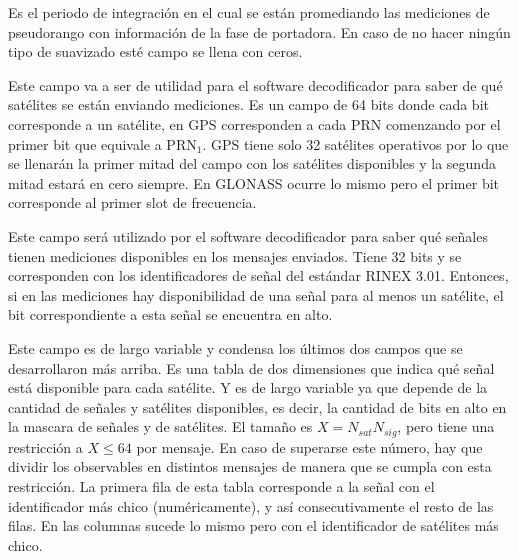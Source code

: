\documentclass[a4paper,12pt,oneside,onecolumn,final,openright]{book}%
\begin{document}
\begin{description}[wide]
	\item[Intervalo de suavizado] Es el periodo de integración en el cual se están promediando las mediciones de pseudorango con información de la fase de portadora. En caso de no hacer ningún tipo de suavizado esté campo se llena con ceros.
	\item[Máscara de satélites GNSS] Este campo va a ser de utilidad para el software decodificador para saber de qué satélites se están enviando mediciones. Es un campo de 64 bits donde cada bit corresponde a un satélite, en GPS corresponden a cada PRN comenzando por el primer bit que equivale a $\text{PRN}_1$. GPS tiene solo 32 satélites operativos por lo que se llenarán la primer mitad del campo con los satélites disponibles y la segunda mitad estará en cero siempre. En GLONASS ocurre lo mismo pero el primer bit corresponde al primer slot de frecuencia.
	\item[Máscara de señales GNSS] Este campo será utilizado por el software decodificador para saber qué señales tienen mediciones disponibles en los mensajes enviados. Tiene 32 bits y se corresponden con los identificadores de señal del estándar RINEX 3.01. Entonces, si en las mediciones hay disponibilidad de una señal para al menos un satélite, el bit correspondiente a esta señal se encuentra en alto.
	\item[Máscara de celdas GNSS] Este campo es de largo variable y condensa los últimos dos campos que se desarrollaron más arriba. Es una tabla de dos dimensiones que indica qué señal está disponible para cada satélite. Y es de largo variable ya que depende de la cantidad de señales y satélites disponibles, es decir, la cantidad de bits en alto en la mascara de señales y de satélites. El tamaño es $X = N_{sat}N_{sig}$, pero tiene una restricción a $X\leq 64$ por mensaje. En caso de superarse este número, hay que dividir los observables en distintos mensajes de manera que se cumpla con esta restricción. La primera fila de esta tabla corresponde a la señal con el identificador más chico (numéricamente), y así consecutivamente el resto de las filas. En las columnas sucede lo mismo pero con el identificador de satélites más chico.
\end{description}
	
\end{document}
